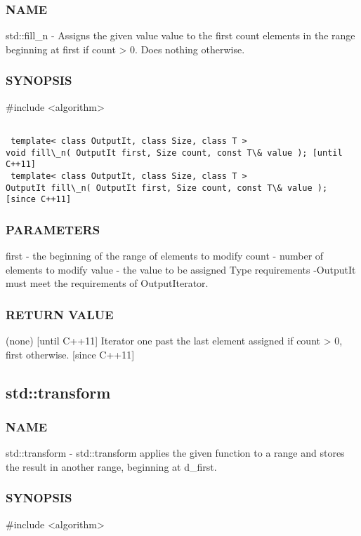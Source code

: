 \subsubsection{NAME}
std::fill\_n - Assigns the given value value to the first count elements in the range beginning at first if count > 0. Does nothing otherwise.

\subsubsection{SYNOPSIS}
\#include <algorithm>

\begin{lstlisting}

 template< class OutputIt, class Size, class T >
void fill\_n( OutputIt first, Size count, const T\& value ); [until C++11]
 template< class OutputIt, class Size, class T >
OutputIt fill\_n( OutputIt first, Size count, const T\& value ); [since C++11]
\end{lstlisting}

\subsubsection{PARAMETERS}
first - the beginning of the range of elements to modify
count - number of elements to modify
value - the value to be assigned
 Type requirements
 -OutputIt must meet the requirements of OutputIterator.

\subsubsection{RETURN VALUE}
 (none) [until C++11]
 Iterator one past the last element assigned if count > 0, first otherwise. [since C++11]


\subsection{std::transform}

\subsubsection{NAME}
std::transform - std::transform applies the given function to a range and stores the result in another range, beginning at d\_first.

\subsubsection{SYNOPSIS}
\#include <algorithm>

